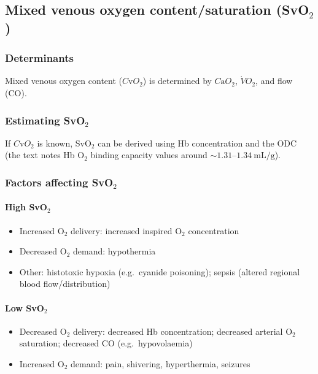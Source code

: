 \documentclass[11pt,a4paper]{article}
\begin{document}
\subsection{Mixed venous oxygen content/saturation (SvO\(_2\))}

\subsubsection{Determinants}
Mixed venous oxygen content (\(C\mathrm{v}O_2\)) is determined by \(C\mathrm{a}O_2\), \(\dot V\!O_2\), and flow (CO).

\subsubsection{Estimating SvO\(_2\)}
If \(C\mathrm{v}O_2\) is known, SvO\(_2\) can be derived using Hb concentration and the ODC (the text notes Hb O\(_2\) binding capacity values around \(\sim 1.31\text{--}1.34~\mathrm{mL/g}\)).

\subsubsection{Factors affecting SvO\(_2\)}
\paragraph{High SvO\(_2\)}
\begin{itemize}
  \item Increased O\(_2\) delivery: increased inspired O\(_2\) concentration
  \item Decreased O\(_2\) demand: hypothermia
  \item Other: histotoxic hypoxia (e.g.\ cyanide poisoning); sepsis (altered regional blood flow/distribution)
\end{itemize}

\paragraph{Low SvO\(_2\)}
\begin{itemize}
  \item Decreased O\(_2\) delivery: decreased Hb concentration; decreased arterial O\(_2\) saturation; decreased CO (e.g.\ hypovolaemia)
  \item Increased O\(_2\) demand: pain, shivering, hyperthermia, seizures
\end{itemize}
\end{document}
